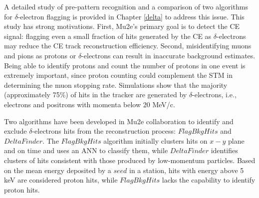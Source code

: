 A detailed study of pre-pattern recognition and a comparison of two 
algorithms for 
$\delta$-electron flagging is provided in Chapter \ref{delta} to 
address this issue. 
This study has strong motivations. First, Mu2e's 
primary goal is 
to detect the CE signal: flagging even a small fraction of hits generated 
by the CE as $\delta$-electrons may reduce the CE track 
reconstruction efficiency. 
Second, misidentifying muons and pions as protons or $\delta$-electrons 
can result in inaccurate background estimates. Being able to identify 
protons and count the number of protons in one event is extremely 
important, since proton counting could complement the STM in determining 
the muon stopping rate. 
Simulations show that the majority (approximately 75\%) of hits in 
the tracker 
are generated by $\delta$-electrons, i.e., electrons and positrons 
with momenta below 20 MeV/c.

Two algorithms have been developed in Mu2e collaboration to identify 
and exclude $\delta$-electrons hits from the reconstruction 
process: $FlagBkgHits$ and $DeltaFinder$. 
The $FlagBkgHits$ algorithm initially clusters hits on $x-y$ plane 
and on time and uses an ANN to classify them, 
while $DeltaFinder$ identifies clusters of hits consistent with those 
produced by 
low-momentum particles. Based on the mean energy deposited by a $seed$ 
in a station, hits with energy above 5 keV are considered 
proton hits, while $FlagBkgHits$ lacks the 
capability to identify proton hits.

